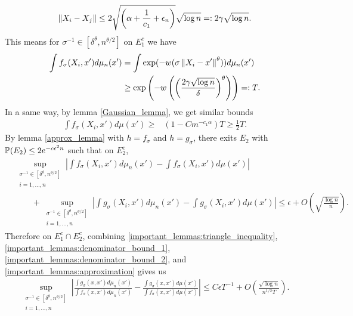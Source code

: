 \documentclass[10pt]{article}
\begin{document}
\begin{align}
  \left\lVert X_i-X_j\right\rVert \leq 2\sqrt{\left(\alpha+\frac{1}{c_1}+\epsilon_n \right)}\sqrt{\log n} =: 2\gamma \sqrt{\log n}.
\end{align}
This means for $\sigma^{-1} \in [\delta^{\theta},n^{\theta/2}]$ on $E_1^c$ we have
\begin{align} \label{important_lemmas:denominator_bound_1}
  \int f_{\sigma}(X_i,x')d\mu_n(x') & = \int \exp(-w(\sigma\left\lVert X_i-x'\right\rVert^{\theta})) d\mu_n(x') \nonumber                                        \\
                                    & \geq \exp \left(-w\left(\left(\frac{2\gamma \sqrt{\log n}}{\delta} \right)^{\theta} \right) \right) =: T.
\end{align}
In a same way, by lemma \ref{Gaussian_lemma}, we get similar bounds
\begin{align} \label{important_lemmas:denominator_bound_2}
  \int f_{\sigma}(X_i,x')d\mu(x') \geq & (1-Cm^{-c_1 \alpha}) T \geq \frac{1}{2} T.
\end{align}
By lemma \ref{approx_lemma} with $h = f_{\sigma}$ and $h = g_{\sigma}$, there exits $E_2$ with $\mathbb{P}(E_2) \leq 2e^{-c\epsilon^2n}$ such that on $E_2^c$,
\begin{align} \label{important_lemmas:approximation}
   & \sup_{\substack{\sigma^{-1} \in [\delta^{\theta},n^{\theta/2}]          \\ i = 1,\dots, n}} \left|\int f_{\sigma}(X_i,x')d\mu_n(x') - \int f_{\sigma}(X_i,x')d\mu(x') \right| \nonumber \\
   & \qquad + \sup_{\substack{\sigma^{-1} \in [\delta^{\theta},n^{\theta/2}] \\ i = 1,\dots, n}} \left|\int g_{\sigma}(X_i,x')d\mu_n(x') - \int g_{\sigma}(X_i,x')d\mu(x') \right|\leq \epsilon + O\left(\sqrt{\frac{\log n}{n}}\right).
\end{align}
Therefore on $E_1^c \cap E_2^c$, combining \eqref{important_lemmas:triangle_inequality}, \eqref{important_lemmas:denominator_bound_1}, \eqref{important_lemmas:denominator_bound_2}, and \eqref{important_lemmas:approximation} gives us
\begin{align} \label{important_lemmas:approximation_2}
  \sup_{\substack{\sigma^{-1} \in [\delta^{\theta},n^{\theta/2}] \\ i = 1,\dots, n}} \left|\frac{\int g_{\sigma}(x,x') d\mu_n(x')}{\int f_{\sigma}(x,x') d\mu_n(x')}-\frac{\int g_{\sigma}(x,x') d\mu(x')}{\int f_{\sigma}(x,x') d\mu(x')}\right| \leq C \epsilon T^{-1} + O\left(\frac{\sqrt{\log n}}{n^{1/2}T}\right).
\end{align}
\end{document}
